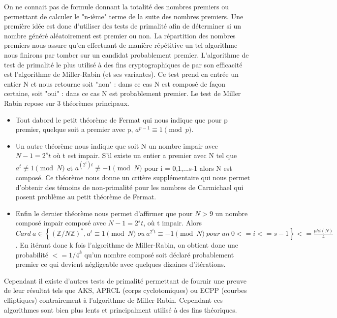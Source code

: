 \documentclass[a4paper,11pt]{article}
\begin{document}
On ne connait pas de formule donnant la totalité des nombres premiers ou permettant de calculer le "n-ième" terme de la suite des nombres premiers. Une première idée est donc d'utiliser des tests de primalité afin de déterminer si un nombre généré aléatoirement est premier ou non. La répartition des nombres premiers nous assure qu'en effectuant de manière répétitive un tel algorithme nous finirons par tomber sur un candidat probablement premier. \newline
L'algorithme de test de primalité le plus utilisé à des fins cryptographiques de par son efficacité  est l'algorithme de Miller-Rabin (et ses variantes). Ce test  prend en entrée un entier N et nous retourne soit "non" : dans ce cas N est composé de façon certaine, soit "oui" : dans ce cas N est probablement premier. \newline
Le test de Miller Rabin repose sur 3 théorèmes
principaux. \newline
\begin{itemize}
\item Tout dabord le petit théorème de Fermat qui nous indique que pour p premier, quelque soit a premier avec p, $a^{p-1} \equiv 1 \pmod p$. \newline

\item Un autre théorème nous indique que soit N un nombre impair avec $N-1 = 2^{s}t$ où t est impair. S'il existe un entier a premier avec N tel que $a^t  \not\equiv 1 \pmod N$ et $a^{(2^i)t} \not\equiv -1 \pmod N$ pour i = 0,1,...s-1 alors N est composé. Ce théorème nous donne un critère supplémentaire qui nous permet d'obtenir des témoins de non-primalité pour les nombres de Carmichael qui posent problème au petit théorème de Fermat. \newline

\item Enfin le dernier théorème nous permet d'affirmer que pour $N > 9$ un nombre composé impair composé avec $N-1 = 2^{s}t$, où t impair. Alors $Card~a \in \left\{(\mathbb{Z}/N\mathbb{Z})^*, a^t \equiv 1 \pmod N~ou~ a^{2^{i}t} \equiv -1 \pmod N~pour~un~0<=i<=s-1\right\} <= \frac{phi(N)}{4}$. En itérant donc k fois l'algorithme de Miller-Rabin, on obtient donc une probabilité $<= 1/4^k$ qu'un nombre composé soit déclaré probablement premier ce qui devient négligeable avec quelques dizaines d'itérations.\newline
\end{itemize} 

Cependant il existe d'autres tests de primalité permettant de fournir une preuve de leur résultat tels que AKS, APRCL (corps cyclotomiques) ou ECPP (courbes elliptiques) contrairement à l'algorithme de Miller-Rabin. Cependant ces algorithmes sont bien plus lents et principalment utilisé à des fins théoriques. \newline
\end{document}
